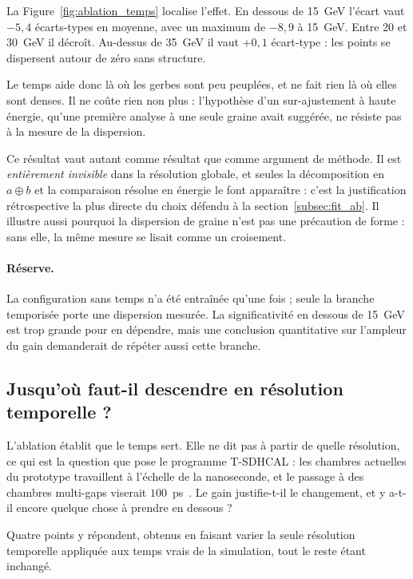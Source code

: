 La Figure~\ref{fig:ablation_temps} localise l'effet. En dessous de 15~GeV l'écart vaut $-5{,}4$ écarts-types en moyenne, avec un maximum de $-8{,}9$ à 15~GeV. Entre 20 et 30~GeV il décroît. Au-dessus de 35~GeV il vaut $+0{,}1$ écart-type : les points se dispersent autour de zéro sans structure.

Le temps aide donc là où les gerbes sont peu peuplées, et ne fait rien là où elles sont denses. Il ne coûte rien non plus : l'hypothèse d'un sur-ajustement à haute énergie, qu'une première analyse à une seule graine avait suggérée, ne résiste pas à la mesure de la dispersion.

Ce résultat vaut autant comme résultat que comme argument de méthode. Il est \emph{entièrement invisible} dans la résolution globale, et seules la décomposition en $a \oplus b$ et la comparaison résolue en énergie le font apparaître : c'est la justification rétrospective la plus directe du choix défendu à la section~\ref{subsec:fit_ab}. Il illustre aussi pourquoi la dispersion de graine n'est pas une précaution de forme : sans elle, la même mesure se lisait comme un croisement.

\paragraph{Réserve.} La configuration sans temps n'a été entraînée qu'une fois ; seule la branche temporisée porte une dispersion mesurée. La significativité en dessous de 15~GeV est trop grande pour en dépendre, mais une conclusion quantitative sur l'ampleur du gain demanderait de répéter aussi cette branche.

\subsection{Jusqu'où faut-il descendre en résolution temporelle ?}
\label{subsec:balayage-temps}

L'ablation établit que le temps sert. Elle ne dit pas à partir de quelle résolution, ce qui est la question que pose le programme T-SDHCAL : les chambres actuelles du prototype travaillent à l'échelle de la nanoseconde, et le passage à des chambres multi-gaps viserait $100$~ps~\cite{tytgat2025tsdhcal}. Le gain justifie-t-il le changement, et y a-t-il encore quelque chose à prendre en dessous ?

Quatre points y répondent, obtenus en faisant varier la seule résolution temporelle appliquée aux temps vrais de la simulation, tout le reste étant inchangé.

